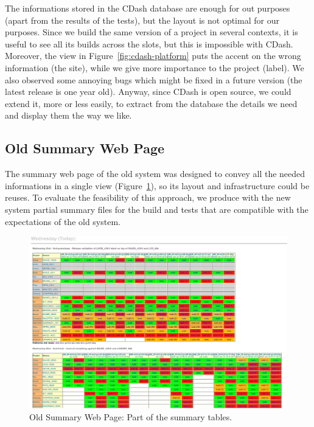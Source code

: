 \documentclass{lhcbnote}
\begin{document}
The informations stored in the CDash database are enough for out purposes (apart
from the results of the tests), but the layout is not optimal for our purposes.
Since we build the same version of a project in several contexts, it is useful
to see all its builds across the slots, but this is impossible with CDash.
Moreover, the view in Figure~\ref{fig:cdash-platform} puts the accent on the
wrong information (the site), while we give more importance to the project
(label).  We also observed some annoying bugs which might be fixed in a future
version (the latest release is one year old).  Anyway, since CDash is open
source, we could extend it, more or less easily, to extract from the database
the details we need and display them the way we like.

\subsection{Old Summary Web Page}
\label{Dashboard:Old}
The summary web page of the old system was designed to convey all the needed
informations in a single view (Figure~\ref{fig:old-summary}), so its layout and
infrastructure could be reuses.  To evaluate the feasibility of this approach,
we produce with the new system partial summary files for the build and tests
that are compatible with the expectations of the old system.

\begin{figure}
  \begin{center}
    \includegraphics[width=15cm]{images/old-summary}
  \end{center}
  \caption{Old Summary Web Page: Part of the summary tables.}
  \label{fig:old-summary}
\end{figure}
\end{document}
